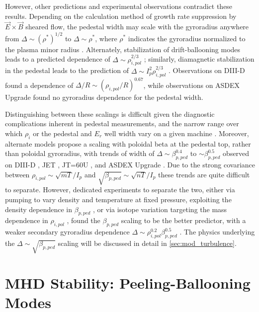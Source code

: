 However, other predictions and experimental observations contradict these results.  Depending on the calculation method of growth rate suppression by $\vec{E}\times\vec{B}$ sheared flow, the pedestal width may scale with the gyroradius anywhere from $\Delta \sim \left(\rho^*\right)^{1/2}$ to $\Delta \sim \rho^*$, where $\rho^*$ indicates the gyroradius normalized to the plasma minor radius \cite{Onjun2002,Beurskens2011}.  Alternately, stabilization of drift-ballooning modes leads to a predicted dependence of $\Delta \sim \rho_{i,pol}^{2/3}$ \cite{Wilson1997}; similarly, diamagnetic stabilization in the pedestal leads to the prediction of $\Delta \sim I_p^2 \rho_{i,pol}^{2/3}$ \cite{Rogers1999}.  Observations on DIII-D \cite{Osborne1998} found a dependence of $\Delta/R \sim (\rho_{i,pol}/R)^{0.67}$, while observations on ASDEX Upgrade \cite{Beurskens2011,Suttrop2000a} found no gyroradius dependence for the pedestal width.

Distinguishing between these scalings is difficult given the diagnostic complications inherent in pedestal measurements, and the narrow range over which $\rho_i$ or the pedestal and $E_r$ well width vary on a given machine \cite{Gohil1998,Maggi2010}.  Moreover, alternate models propose a scaling with poloidal beta at the pedestal top, rather than poloidal gyroradius, with trends of width of $\Delta \sim \beta_{p,ped}^{0.4}$ to $\sim \beta_{p,ped}^{0.5}$ observed on DIII-D \cite{Osborne1998,Groebner1998a}, JET \cite{Maggi2010}, JT=60U \cite{Urano2008}, and ASDEX Upgrade \cite{Beurskens2011}.  Due to the strong covariance between $\rho_{i,pol} \sim \sqrt{mT}/I_p$ and $\sqrt{\beta_{p,ped}} \sim \sqrt{nT}/I_p$ these trends are quite difficult to separate.  However, dedicated experiments to separate the two, either via pumping to vary density and temperature at fixed pressure, exploiting the density dependence in $\beta_{p,ped}$ \cite{Osborne1998}, or via isotope variation targeting the mass dependence in $\rho_{
i,pol}$ \cite{Urano2008,Saibene1999}, found the $\beta_{p,ped}$ scaling to be the better predictor, with a weaker secondary gyroradius dependence $\Delta \sim \rho_{i,pol}^{0.2} \beta_{p,ped}^{0.5}$ \cite{Urano2008,Maggi2010}.  The physics underlying the $\Delta \sim \sqrt{\beta_{p,ped}}$ scaling will be discussed in detail in \cref{sec:mod_turbulence}.\nicesectionending

\section{MHD Stability: Peeling-Ballooning Modes}\label{sec:mod_pb}

